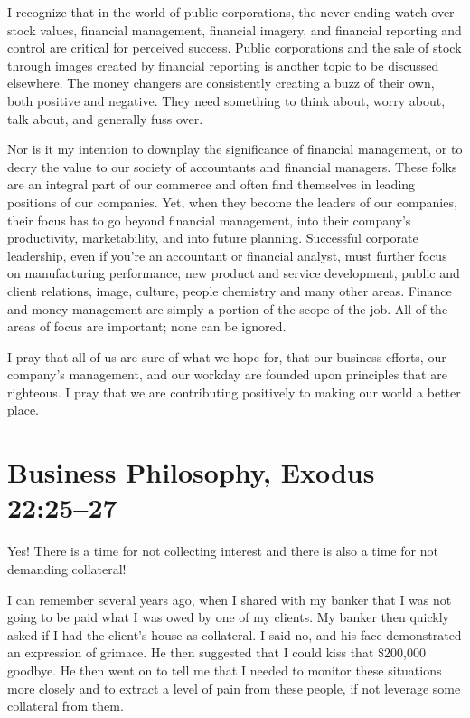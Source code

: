 \documentclass[12pt]{memoir}
\begin{document}
I recognize that in the world of public corporations, the never-ending watch over stock values, financial management, financial imagery, and financial reporting and control are critical for perceived success. Public corporations and the sale of stock through images created by financial reporting is another topic to be discussed elsewhere. The money changers are consistently creating a buzz of their
own, both positive and negative. They need something to think about, worry about, talk about, and generally fuss over. 

Nor is it my intention to downplay the significance of financial management, or to decry the value to our society of accountants and financial managers. These folks are an integral part of our commerce and often find themselves in leading positions of our companies. Yet, when they become the leaders of our companies, their focus has to go beyond financial management, into their company's productivity, marketability, and into future planning. Successful corporate leadership, even if you're an accountant or financial analyst, must further focus on manufacturing performance, new product and service development, public and client relations, image, culture, people chemistry and many other areas. Finance and money management are simply a portion of the scope of the job. All of the areas of focus are important; none can be ignored. 

I pray that all of us are sure of what we hope for, that our
business efforts, our company's management, and our workday are founded upon principles that are righteous. I pray that we are contributing 
positively to making our world a better place.

\section[Business Philosophy]{Business Philosophy, Exodus 22:25--27}
\label{collateral_1}

Yes! There is a time for not collecting interest and there is also
a time for not demanding collateral!

I can remember several years ago, when I shared with my banker that I was not going to be paid what I was owed by one of my clients. My banker then quickly asked if I had the client's house as collateral. I said no, and his face demonstrated an expression of grimace. He then suggested that I could kiss that \$200,000 goodbye. He then went on to tell me that I needed to monitor these situations more closely and to extract a level of pain from these people, if not leverage some collateral from them. 
\end{document}
